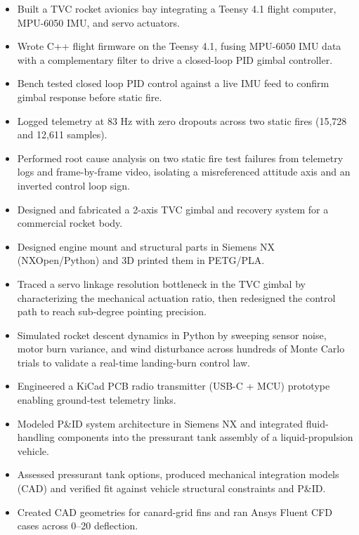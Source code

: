 \begin{itemize}
  \item Built a TVC rocket avionics bay integrating a Teensy 4.1 flight computer, MPU-6050 IMU, and servo actuators.
  \item Wrote C++ flight firmware on the Teensy 4.1, fusing MPU-6050 IMU data with a complementary filter to drive a closed-loop PID gimbal controller.
  \item Bench tested closed loop PID control against a live IMU feed to confirm gimbal response before static fire.
  \item Logged telemetry at 83 Hz with zero dropouts across two static fires (15,728 and 12,611 samples).
  \item Performed root cause analysis on two static fire test failures from telemetry logs and frame-by-frame video, isolating a misreferenced attitude axis and an inverted control loop sign.
  \item Designed and fabricated a 2-axis TVC gimbal and recovery system for a commercial rocket body.
  \item Designed engine mount and structural parts in Siemens NX (NXOpen/Python) and 3D printed them in PETG/PLA.
  \item Traced a servo linkage resolution bottleneck in the TVC gimbal by characterizing the mechanical actuation ratio, then redesigned the control path to reach sub-degree pointing precision.
  \item Simulated rocket descent dynamics in Python by sweeping sensor noise, motor burn variance, and wind disturbance across hundreds of Monte Carlo trials to validate a real-time landing-burn control law.
\end{itemize}
\entrygap

\begin{itemize}
  \item Engineered a KiCad PCB radio transmitter (USB-C + MCU) prototype enabling ground-test telemetry links.
  \item Modeled P\&ID system architecture in Siemens NX and integrated fluid-handling components into the pressurant tank assembly of a liquid-propulsion vehicle.
  \item Assessed pressurant tank options, produced mechanical integration models (CAD) and verified fit against vehicle structural constraints and P\&ID.
  \item Created CAD geometries for canard-grid fins and ran Ansys Fluent CFD cases across 0--20\textdegree{} deflection.
\end{itemize}
\entrygap

